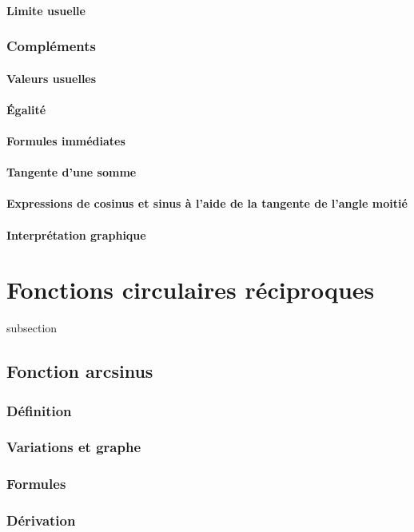 \documentclass[12pt,a4paper,french]{book}
\begin{document}
			\subsubsection{Limite usuelle}
		\subsection{Compléments}
			\subsubsection{Valeurs usuelles}
			\subsubsection{Égalité}
			\subsubsection{Formules immédiates}
			\subsubsection{Tangente d'une somme}
			\subsubsection{Expressions de cosinus et sinus à l'aide de la tangente de l'angle moitié}
			\subsubsection{Interprétation graphique}
\chapter{Fonctions circulaires réciproques}subsection{}
	\section{Fonction arcsinus}
		\subsection{Définition}
		\subsection{Variations et graphe}
		\subsection{Formules}
		\subsection{Dérivation}
\end{document}
